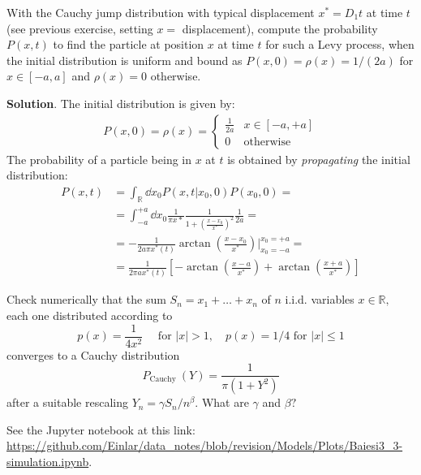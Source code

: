 \documentclass[../template.tex]{subfiles}
\begin{document}
\begin{exo}
    With the Cauchy jump distribution with typical displacement $x^{*}=D_{1} t$ at time $t$ (see previous exercise, setting $x=$ displacement), compute the probability $P(x, t)$ to find the particle at position $x$ at time $t$ for such a Levy process, when the initial distribution is uniform and bound as $P(x, 0)=\rho(x)=1 /(2 a)$ for $x \in[-a, a]$ and $\rho(x)=0$ otherwise.

    \medskip

    \textbf{Solution}. The initial distribution is given by:
    \begin{align*}
        P(x,0) = \rho(x) = \begin{cases}
            \frac{1}{2a} & x \in [-a,+a]\\
            0 & \text{otherwise} 
        \end{cases}
    \end{align*} 
    The probability of a particle being in $x$ at $t$ is obtained by \textit{propagating} the initial distribution:
    \begin{align*}
        P(x,t) &= \int_{\mathbb{R}} \dd{x_0} P(x,t|x_0,0) P(x_0,0) = \\
        &= \int_{-a}^{+a} \dd{x_0} \frac{1}{\pi x*} \frac{1}{1+\left(\frac{x- x_0}{x^*} \right)^2} \frac{1}{2a} = \\
        &= -\frac{1}{2 a \pi x^*(t)}   \arctan\left(\frac{x-x_0}{x^*} \right)\Big|_{x_0 = -a}^{x_0 = +a} =\\
        &= \frac{1}{2 \pi a x^*(t)} \left[-\arctan\left(\frac{x-a}{x^*} \right) + \arctan\left(\frac{x+a}{x^*} \right)\right] 
    \end{align*} 
\end{exo}

\begin{exo}
Check numerically that the sum $S_{n}=x_{1}+\ldots+x_{n}$ of $n$ i.i.d. variables $x \in \mathbb{R},$ each one distributed according to
$$
p(x)=\frac{1}{4 x^{2}} \quad \text { for }|x|>1, \quad p(x)=1 / 4 \text { for }|x| \leq 1
$$
converges to a Cauchy distribution
$$
P_{\text {Cauchy }}(Y)=\frac{1}{\pi\left(1+Y^{2}\right)}
$$
after a suitable rescaling $Y_{n}=\gamma S_{n} / n^{\beta} .$ What are $\gamma$ and $\beta ?$
\end{exo}

See the Jupyter notebook at this link: \url{https://github.com/Einlar/data_notes/blob/revision/Models/Plots/Baiesi3_3-simulation.ipynb}.
\end{document}
